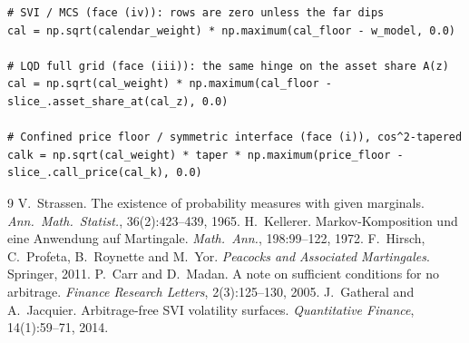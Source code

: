 \documentclass[11pt]{article}
\begin{document}
\begin{lstlisting}[caption={The calendar hinges as they appear (inline)
in the calibrators: face (iv) for the overlays, face (iii) on the LQD
grid, face (i) with taper for the confined price floor and the
symmetric interfaces.}]
# SVI / MCS (face (iv)): rows are zero unless the far dips
cal = np.sqrt(calendar_weight) * np.maximum(cal_floor - w_model, 0.0)

# LQD full grid (face (iii)): the same hinge on the asset share A(z)
cal = np.sqrt(cal_weight) * np.maximum(cal_floor - slice_.asset_share_at(cal_z), 0.0)

# Confined price floor / symmetric interface (face (i)), cos^2-tapered
calk = np.sqrt(cal_weight) * taper * np.maximum(price_floor - slice_.call_price(cal_k), 0.0)
\end{lstlisting}

\begin{thebibliography}{9}
 V.~Strassen.  The existence of probability
measures with given marginals.  \emph{Ann.\ Math.\ Statist.},
36(2):423--439, 1965.
 H.~Kellerer.  Markov-Komposition und eine
Anwendung auf Martingale.  \emph{Math.\ Ann.}, 198:99--122, 1972.
 F.~Hirsch, C.~Profeta, B.~Roynette and M.~Yor.
\emph{Peacocks and Associated Martingales}.  Springer, 2011.
 P.~Carr and D.~Madan.  A note on sufficient
conditions for no arbitrage.  \emph{Finance Research Letters},
2(3):125--130, 2005.
 J.~Gatheral and A.~Jacquier.
Arbitrage-free SVI volatility surfaces.  \emph{Quantitative Finance},
14(1):59--71, 2014.
\end{thebibliography}
\end{document}
